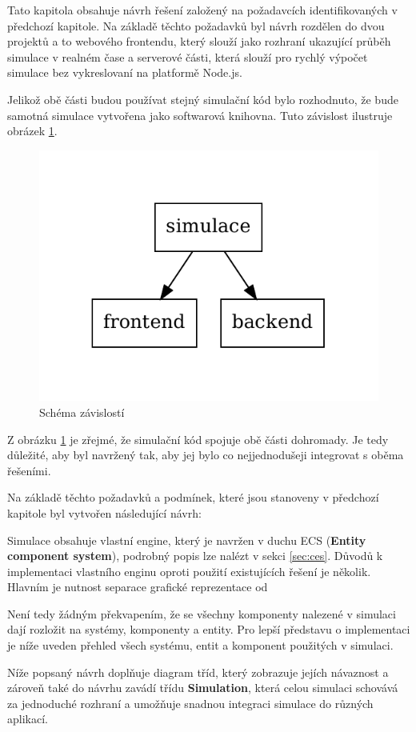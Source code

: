 Tato kapitola obsahuje návrh řešení založený na požadavcích identifikovaných v předchozí kapitole. Na základě těchto požadavků byl návrh rozdělen do dvou projektů a to webového frontendu, který slouží jako rozhraní ukazující průběh simulace v realném čase a serverové části, která slouží pro rychlý výpočet simulace bez vykreslovaní na platformě Node.js.

Jelikož obě části budou používat stejný simulační kód bylo rozhodnuto, že bude samotná simulace vytvořena jako softwarová knihovna. Tuto závislost ilustruje obrázek \ref{fig:dependency}.
\begin{figure}[h!]
	\centering
	\includegraphics[width=0.4\linewidth]{architektura}
	\caption{Schéma závislostí}
	\label{fig:dependency}
\end{figure}


Z obrázku \ref{fig:dependency} je zřejmé, že simulační kód spojuje obě části dohromady. Je tedy důležité, aby byl navržený tak, aby jej bylo co nejjednodušeji integrovat s oběma řešeními.

Na základě těchto požadavků a podmínek, které jsou stanoveny v předchozí kapitole byl vytvořen následující návrh:

\label{sec:ECS}
Simulace obsahuje vlastní engine, který je navržen v duchu ECS (\textbf{Entity component system}), podrobný popis lze nalézt v sekci \ref{sec:ces}. Důvodů k implementaci vlastního enginu oproti použití existujících řešení je několik. Hlavním je nutnost separace grafické reprezentace od 

Není tedy žádným překvapením, že se všechny komponenty nalezené v simulaci dají rozložit na systémy, komponenty a entity. Pro lepší představu o implementaci je níže uveden přehled všech systému, entit a komponent použitých v simulaci.

Níže popsaný návrh doplňuje diagram tříd, který zobrazuje jejích návaznost a zároveň také do návrhu zavádí třídu \textbf{Simulation}, která celou simulaci schovává za jednoduché rozhraní a umožňuje snadnou integraci simulace do různých aplikací.

